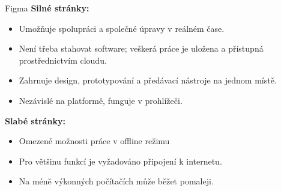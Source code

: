\begin{subsection}{Figma}
    \textbf{Silné stránky:}
    \begin{itemize}
        \item Umožňuje spolupráci a společné úpravy v reálném čase.
        \item Není třeba stahovat software; veškerá práce je uložena a přístupná prostřednictvím cloudu.
        \item Zahrnuje design, prototypování a předávací nástroje na jednom místě.
        \item Nezávislé na platformě, funguje v prohlížeči.
    \end{itemize}

    \textbf{Slabé stránky:}
    \begin{itemize}
        \item Omezené možnosti práce v offline režimu
        \item Pro většinu funkcí je vyžadováno připojení k internetu.
        \item Na méně výkonných počítačích může běžet pomaleji\cite{w_industry_the_ultimate_battle_figma_vs_sketch_vs_adobe_xd, h_hc_en_us}.
    \end{itemize}
\end{subsection}

